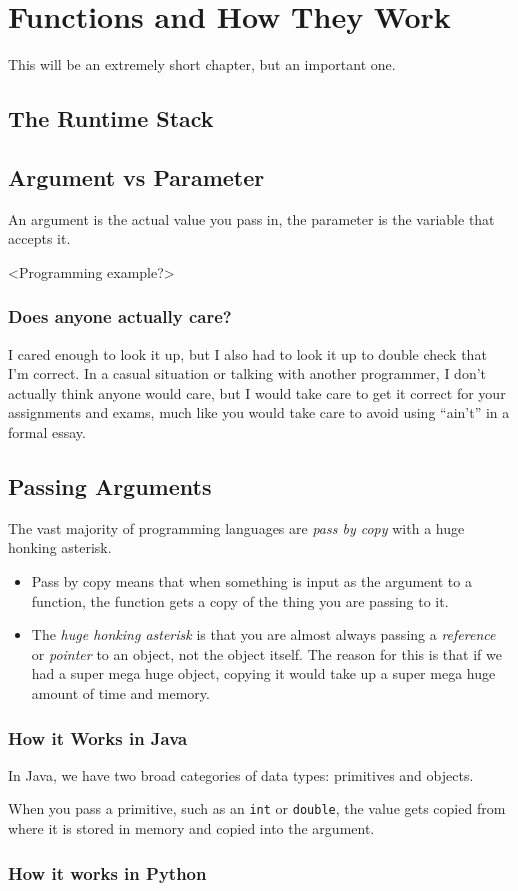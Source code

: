 \chapter{Functions and How They Work}

This will be an extremely short chapter, but an important one.

\section{The Runtime Stack}

\section{Argument vs Parameter}
An argument is the actual value you pass in, the parameter is the variable that accepts it.

<Programming example?>

\subsection{Does anyone actually care?}

I cared enough to look it up, but I also had to look it up to double check that I'm correct.  
In a casual situation or talking with another programmer, I don't actually think anyone would care, but I would take care to get it correct for your assignments and exams, much like you would take care to avoid using ``ain't'' in a formal essay.

\section{Passing Arguments}

The vast majority of programming languages are \textit{pass by copy} with a huge honking asterisk.
\begin{itemize}
	\item Pass by copy means that when something is input as the argument to a function, the function gets a copy of the thing you are passing to it.
	\item The \textit{huge honking asterisk} is that you are almost always passing a \textit{reference} or \textit{pointer} to an object, not the object itself.  The reason for this is that if we had a super mega huge object, copying it would take up a super mega huge amount of time and memory.
\end{itemize}



\subsection{How it Works in Java}
In Java, we have two broad categories of data types: primitives and objects.

When you pass a primitive, such as an \texttt{int} or \texttt{double}, the value gets copied from where it is stored in memory and copied into the argument.


\subsection{How it works in Python}

